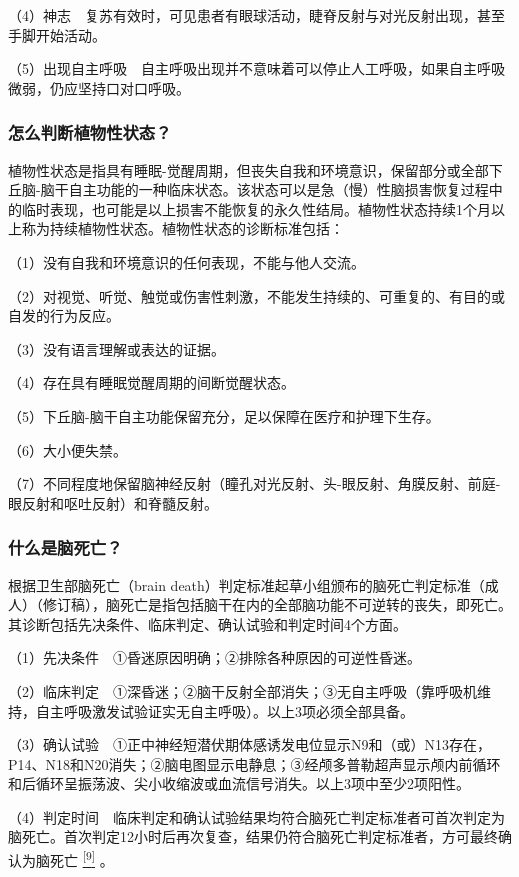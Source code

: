 （4）神志　复苏有效时，可见患者有眼球活动，睫脊反射与对光反射出现，甚至手脚开始活动。

（5）出现自主呼吸　自主呼吸出现并不意味着可以停止人工呼吸，如果自主呼吸微弱，仍应坚持口对口呼吸。

\subsubsection{怎么判断植物性状态？}

植物性状态是指具有睡眠-觉醒周期，但丧失自我和环境意识，保留部分或全部下丘脑-脑干自主功能的一种临床状态。该状态可以是急（慢）性脑损害恢复过程中的临时表现，也可能是以上损害不能恢复的永久性结局。植物性状态持续1个月以上称为持续植物性状态。植物性状态的诊断标准包括：

（1）没有自我和环境意识的任何表现，不能与他人交流。

（2）对视觉、听觉、触觉或伤害性刺激，不能发生持续的、可重复的、有目的或自发的行为反应。

（3）没有语言理解或表达的证据。

（4）存在具有睡眠觉醒周期的间断觉醒状态。

（5）下丘脑-脑干自主功能保留充分，足以保障在医疗和护理下生存。

（6）大小便失禁。

（7）不同程度地保留脑神经反射（瞳孔对光反射、头-眼反射、角膜反射、前庭-眼反射和呕吐反射）和脊髓反射。

\subsubsection{什么是脑死亡？}

根据卫生部脑死亡（brain
death）判定标准起草小组颁布的脑死亡判定标准（成人）（修订稿），脑死亡是指包括脑干在内的全部脑功能不可逆转的丧失，即死亡。其诊断包括先决条件、临床判定、确认试验和判定时间4个方面。

（1）先决条件　①昏迷原因明确；②排除各种原因的可逆性昏迷。

（2）临床判定　①深昏迷；②脑干反射全部消失；③无自主呼吸（靠呼吸机维持，自主呼吸激发试验证实无自主呼吸）。以上3项必须全部具备。

（3）确认试验　①正中神经短潜伏期体感诱发电位显示N9和（或）N13存在，P14、N18和N20消失；②脑电图显示电静息；③经颅多普勒超声显示颅内前循环和后循环呈振荡波、尖小收缩波或血流信号消失。以上3项中至少2项阳性。

（4）判定时间　临床判定和确认试验结果均符合脑死亡判定标准者可首次判定为脑死亡。首次判定12小时后再次复查，结果仍符合脑死亡判定标准者，方可最终确认为脑死亡
\protect\hyperlink{text00023.htmlux5cux23ch9-22}{\textsuperscript{{[}9{]}}}
。

